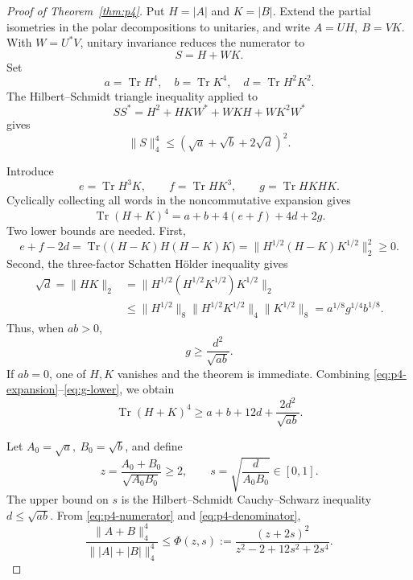 \documentclass[11pt,reqno]{amsart}
\theoremstyle{remark}
\newcommand{\Tr}{\operatorname{Tr}}
\begin{document}
\begin{proof}[Proof of Theorem~\ref{thm:p4}]
Put \(H=|A|\) and \(K=|B|\).  Extend the partial isometries in the polar
decompositions to unitaries, and write \(A=UH,\ B=VK\).
With \(W=U^*V\), unitary invariance reduces the numerator to
\[
 S=H+WK.
\]
Set
\[
 a=\Tr H^4,\quad b=\Tr K^4,\quad d=\Tr H^2K^2.
\]
The Hilbert--Schmidt triangle inequality applied to
\[
 SS^*=H^2+HKW^*+WKH+WK^2W^*
\]
gives
\begin{equation}\label{eq:p4-numerator}
 \|S\|_4^4
 \le(\sqrt a+\sqrt b+2\sqrt d)^2.
\end{equation}

Introduce
\[
 e=\Tr H^3K,\qquad f=\Tr HK^3,\qquad g=\Tr HKHK.
\]
Cyclically collecting all words in the noncommutative expansion gives
\begin{equation}\label{eq:p4-expansion}
 \Tr(H+K)^4=a+b+4(e+f)+4d+2g.
\end{equation}
Two lower bounds are needed.  First,
\begin{equation}\label{eq:p4-positive}
 e+f-2d
 =
 \Tr\big((H-K)H(H-K)K\big)
 =
 \|H^{1/2}(H-K)K^{1/2}\|_2^2
 \ge0.
\end{equation}
Second, the three-factor Schatten H\"older inequality gives
\begin{align*}
 \sqrt d=\|HK\|_2
 &=
 \|H^{1/2}(H^{1/2}K^{1/2})K^{1/2}\|_2\\
 &\le
 \|H^{1/2}\|_8
 \|H^{1/2}K^{1/2}\|_4
 \|K^{1/2}\|_8
 =
 a^{1/8}g^{1/4}b^{1/8}.
\end{align*}
Thus, when \(ab>0\),
\begin{equation}\label{eq:g-lower}
 g\ge\frac{d^2}{\sqrt{ab}}.
\end{equation}
If \(ab=0\), one of \(H,K\) vanishes and the theorem is immediate.
Combining \eqref{eq:p4-expansion}--\eqref{eq:g-lower}, we obtain
\begin{equation}\label{eq:p4-denominator}
 \Tr(H+K)^4
 \ge a+b+12d+\frac{2d^2}{\sqrt{ab}}.
\end{equation}

Let \(A_0=\sqrt a,\ B_0=\sqrt b\), and define
\[
 z=\frac{A_0+B_0}{\sqrt{A_0B_0}}\ge2,\qquad
 s=\sqrt{\frac{d}{A_0B_0}}\in[0,1].
\]
The upper bound on \(s\) is the Hilbert--Schmidt Cauchy--Schwarz
inequality \(d\le\sqrt{ab}\).  From
\eqref{eq:p4-numerator} and \eqref{eq:p4-denominator},
\begin{equation}\label{eq:Phi}
 \frac{\|A+B\|_4^4}{\||A|+|B|\|_4^4}
 \le
 \Phi(z,s)
 :=
 \frac{(z+2s)^2}{z^2-2+12s^2+2s^4}.
\end{equation}


\end{proof}
\end{document}
